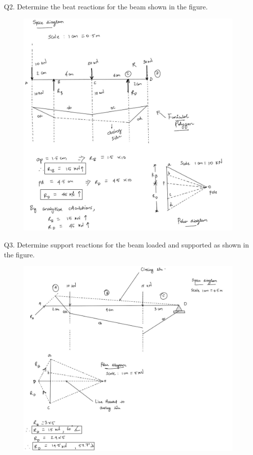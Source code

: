 \documentclass[11pt]{article}
\begin{document}
\pagebreak
Q2. Determine the beat reactions for the beam shown in the figure. 
\begin{figure}[H]
	\includegraphics[scale=0.42]{g2.jpg}
	\label{fig: Polygon Law}
\end{figure}

\pagebreak

Q3. Determine support reactions for the beam loaded and supported as shown in the figure.
\begin{figure}[H]
	\includegraphics[scale=0.44]{g3.jpg}
	\label{fig: Polygon Law}
\end{figure}
\end{document}
